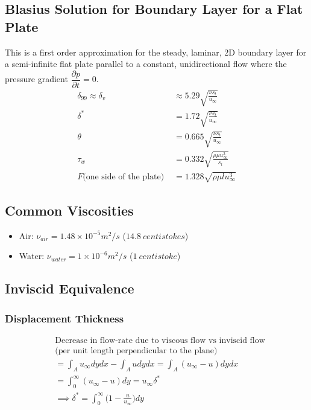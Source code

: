 \documentclass[11pt, letterpaper, notitlepage]{article}
\begin{document}
\subsection{Blasius Solution for Boundary Layer for a Flat Plate}
This is a first order approximation for the steady, laminar, 2D boundary layer for a semi-infinite flat plate parallel to a constant, unidirectional flow where the pressure gradient $\dfrac{\partial p}{\partial t} = 0$.
\begin{align*}
\delta_{99} \approx \delta_v &\approx 5.29 \sqrt{\frac{\nu s_t}{u_\infty}} \\
\delta^* &= 1.72 \sqrt{\frac{\nu s_t}{u_\infty}} \\
\theta &= 0.665 \sqrt{\frac{\nu s_t}{u_\infty}} \\
\tau_w &= 0.332 \sqrt{\frac{\rho \mu u^3_\infty}{s_t}} \\
F \text{(one side of the plate) } &= 1.328 \sqrt{\rho \mu l u^3_\infty}
\end{align*}

\subsection{Common Viscosities}
\begin{itemize}
  \item Air: $\nu_{air} = 1.48 \times 10^{-5} m^2/s$ ($14.8\ centistokes$) \\
  \item Water: $\nu_{water} = 1 \times 10^{-6} m^2/s$ ($1\ centistoke$)
\end{itemize}

\subsection{Inviscid Equivalence}
\subsubsection{Displacement Thickness}
\begin{align*}
& \text{Decrease in flow-rate due to viscous flow vs inviscid flow} \\
& \text{(per unit length perpendicular to the plane)} \\
&= \int_A u_\infty dy dx - \int_A u dy dx = \int_A (u_\infty - u) dy dx \\
&= \int_0^\infty (u_\infty-u) dy = u_\infty \delta^* \\
& \implies \boxed{\delta^* = \int_0^\infty \biggl(1-\frac{u}{u_\infty} \biggr) dy}
\end{align*}
\end{document}
